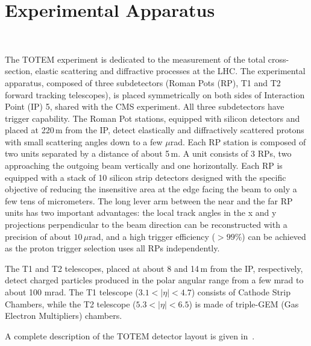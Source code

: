 \section{Experimental Apparatus}

\\

The TOTEM experiment is dedicated to the measurement of the total 
cross-section, elastic scattering
and diffractive processes at the LHC. The experimental
apparatus, composed of three subdetectors
(Roman Pots (RP), T1 and T2 forward tracking telescopes), 
is placed symmetrically on both sides of Interaction Point (IP) 5, shared
with the CMS experiment. All three subdetectors have
trigger capability. The Roman Pot stations, equipped with
silicon detectors and placed at 220\,m from the IP,
detect elastically and diffractively scattered protons with
small scattering angles down to a few $\mu$rad. 
Each RP station is composed of two units separated
by a distance of about 5\,m. A unit consists of 3 RPs, two
approaching the outgoing beam vertically and one horizontally.
Each RP is equipped with a stack of 10 silicon
strip detectors designed with the specific objective of
reducing the insensitive area at the edge facing the beam
to only a few tens of micrometers. The long lever arm
between the near and the far RP units has two important
advantages: the local track angles in the x and y projections
perpendicular to the beam direction can be reconstructed
with a precision of about $10\,\mu$rad, and a high trigger efficiency
($> 99$\%) can be achieved as the proton trigger selection
uses all RPs independently.

The T1 and T2 telescopes, placed at about 8 and 14\,m from the IP, 
respectively, detect charged particles produced in the polar
angular range from a few mrad to about 100 mrad. The T1 telescope
($3.1 < |\eta| < 4.7$) consists of Cathode Strip Chambers,
while the T2 telescope ($5.3 < |\eta| < 6.5$) is made of
triple-GEM (Gas Electron Multipliers) chambers.

A complete description of the TOTEM detector layout is given in~\cite{totem-jinst}.
